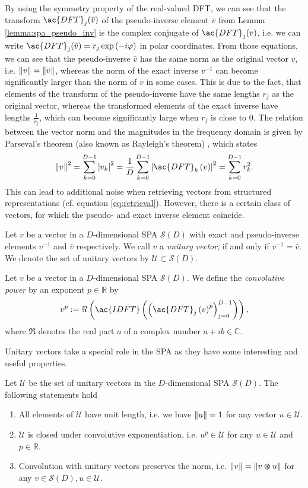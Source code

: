 By using the symmetry property of the real-valued \ac{DFT}, we can see that the transform $\ac{DFT}_j(\bar{v})$ of the pseudo-inverse element $\bar{v}$ from Lemma \ref{lemma:spa_pseudo_inv} is the complex conjugate of $\ac{DFT}_j(v)$, i.e. we can write $\ac{DFT}_j(\bar{v}) = r_j \exp\left(-i\varphi\right)$ in polar coordinates.
From those equations, we can see that the pseudo-inverse $\bar{v}$ has the same norm as the original vector $v$, i.e. $\left\| v \right\| = \left\| \bar{v} \right\|$, whereas the norm of the exact inverse $v^{-1}$ can become significantly larger than the norm of $v$ in some cases.
This is due to the fact, that elements of the transform of the pseudo-inverse have the same lengths $r_j$ as the original vector, whereas the transformed elements of the exact inverse have lengths $\frac{1}{r_j}$, which can become significantly large when $r_j$ is close to $0$.
The relation between the vector norm and the magnitudes in the frequency domain is given by Parseval's theorem (also known as Rayleigh's theorem) \cite[Chap. 6]{Bracewell2000}, which states
\[
\norm{v}^2 = \sum_{k=0}^{D-1} \left| v_{k} \right|^{2} = \frac{1}{D} \sum_{k=0}^{D-1} \left|\ac{DFT}_{k}\left(v\right)\right|^{2} = \sum_{k=0}^{D-1} r_{k}^{2}.
\]
This can lead to additional noise when retrieving vectors from structured representations (cf. equation \ref{eq:retrieval}).
However, there is a certain class of vectors, for which the pseudo- and exact inverse element coincide.
\begin{defn}
	\label{def:unitary_vec}
	Let $v$ be a vector in a $D$-dimensional \ac{SPA} $\mathcal{S}(D)$ with exact and pseudo-inverse elements $v^{-1}$ and $\bar{v}$ respectively.
	We call $v$ a \emph{unitary vector}, if and only if $v^{-1} = \bar{v}$. 
	We denote the set of unitary vectors by $\mathcal{U} \subset \mathcal{S}(D)$.
\end{defn}
\begin{defn}
	\label{def:conv_power}
	Let $v$ be a vector in a $D$-dimensional \ac{SPA} $\mathcal{S}(D)$. We define the \emph{convolutive power} by an exponent $p \in \mathbb{R}$ by
	\[
	v^{p} := \Re\left(\ac{IDFT} \left(\left(\ac{DFT}_{j}\left(v\right)^{p}\right)_{j=0}^{D-1}\right)\right),
	\]
	where $\Re$ denotes the real part $a$ of a complex number $a + ib \in \mathbb{C}$.
\end{defn}
Unitary vectors take a special role in the \ac{SPA} as they have some interesting and useful properties.
\begin{lemma}
	\label{lemma:unitary_vec}
	Let $\mathcal{U}$ be the set of unitary vectors in the $D$-dimensional \ac{SPA} $\mathcal{S}(D)$. The following statements hold
 	\begin{enumerate}[label=\roman*]
		\item All elements of $\mathcal{U}$ have unit length, i.e. we have $\left\| u \right\| = 1$ for any vector $u \in \mathcal{U}$.
		\item $\mathcal{U}$ is closed under convolutive exponentiation, i.e. $u^{p} \in \mathcal{U}$ for any $u \in \mathcal{U}$ and $p \in \mathbb{R}$.
		\item Convolution with unitary vectors preserves the norm, i.e. $\left\| v \right\| = \left\| v \varoast u \right\|$ for any $v \in \mathcal{S}(D), u \in \mathcal{U}$.
	\end{enumerate}
\end{lemma}
